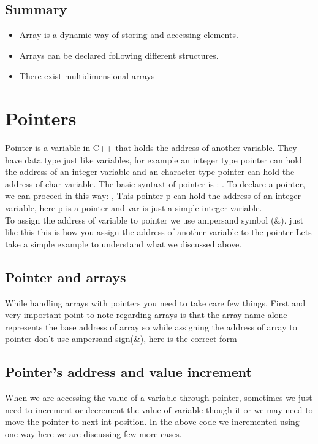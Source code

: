 \documentclass[11pt, a4paper]{article}
\begin{document}
\subsection{Summary}
\begin{itemize}
    \item Array is a dynamic way of storing and accessing elements.
    \item Arrays can be declared following different structures.
    \item There exist multidimensional arrays
\end{itemize}


\newpage
\section{Pointers}
Pointer is a variable in C++ that holds the address of another variable.
They have data type just like variables, for example an integer type pointer
can hold the address of an integer variable and an character type pointer can hold
the address of char variable. The basic syntaxt of pointer is :
. To declare a pointer, we can proceed in this way:
, This pointer p can hold the address of an integer
variable, here p is a pointer and var is just a simple integer variable.\\
To assign the address of variable to pointer we use ampersand symbol (\&). just like this
 this is how you assign the address of another variable to the pointer
Lets take a simple example to understand what we discussed above.


\subsection{Pointer and arrays}
While handling arrays with pointers you need to take care few things.
First and very important point to note regarding arrays is that the array name
alone represents the base address of array so while assigning the address of array
to pointer don’t use ampersand sign(\&), here is the correct form 


\subsection{Pointer's address and value increment}
When we are accessing the value of a variable through pointer, sometimes we just
need to increment or decrement the value of variable though it or we may need to move
the pointer to next int position. In the above code we incremented using one way here
we are discussing few more cases.

\end{document}
